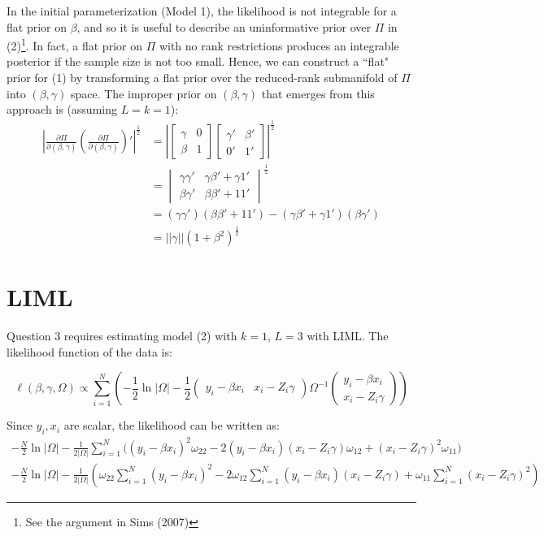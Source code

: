 \documentclass{article}
\begin{document}
In the initial parameterization (Model 1), the likelihood is not integrable for a flat prior on $\beta$, and so it is useful to describe an uninformative prior over $\Pi$ in (2)\footnote{See the argument in Sims (2007)}.  In fact, a flat prior on $\Pi$ with no rank restrictions produces an integrable posterior if the sample size is not too small.  Hence, we can construct a ``flat" prior for (1) by transforming a flat prior over the reduced-rank submanifold of $\Pi$ into $(\beta, \gamma)$ space. The improper prior on $(\beta, \gamma)$ that emerges from this approach is (assuming $L=k=1$):
\begin{align*}
\left| \frac{\partial\Pi}{\partial(\beta, \gamma)} \left( \frac{\partial\Pi}{\partial(\beta, \gamma)} \right)'\right| ^{\frac{1}{2}} &= \left | \begin{bmatrix} \gamma & 0 \\ \beta & 1 \end{bmatrix}  \begin{bmatrix} \gamma' & \beta' \\ 0' & 1' \end{bmatrix}  \right | ^{\frac{1}{2}} \\
&= \begin{vmatrix}  \gamma\gamma' & \gamma\beta' + \gamma 1' \\ \beta\gamma' & \beta\beta' + 11'  \end{vmatrix} ^{\frac{1}{2}} \\
&= (\gamma\gamma')(\beta\beta' + 11') - (\gamma\beta'+\gamma1')(\beta\gamma') \\
&= || \gamma|| (1+\beta^2)^\frac{1}{2} 
\end{align*}

\section*{LIML}
Question 3 requires estimating model (2) with $k=1$, $L=3$ with LIML. The likelihood function of the data is:

\[
\ell (\beta, \gamma, \Omega) \propto \sum_{i=1}^{N} \left( - \frac{1}{2} \ln | \Omega | - \frac{1}{2} \begin{pmatrix} y_i - \beta x_i & x_i - Z_i\gamma\end{pmatrix} \Omega^{-1} \begin{pmatrix} y_i - \beta x_i  \\  x_i - Z_i \gamma\end{pmatrix} \right)
\]

Since $y_i, x_i$ are scalar, the likelihood can be written as:
\begin{gather*}
-\frac{N}{2}\ln | \Omega| - \frac{1}{2 | \Omega| }\sum_{i=1}^N \Big( (y_i - \beta x_i)^2\omega_{22} - 2(y_i - \beta x_i)(x_i - Z_i \gamma)\omega_{12} + (x_i - Z_i \gamma)^2\omega_{11}\Big) \\
-\frac{N}{2}\ln | \Omega| - \frac{1}{2 | \Omega| } \left(\omega_{22} \sum_{i=1}^N (y_i - \beta x_i)^2 - 2 \omega_{12} \sum_{i=1}^N (y_i - \beta x_i)(x_i - Z_i \gamma) + \omega_{11} \sum_{i=1}^N (x_i - Z_i \gamma)^2 \right)
    \end{gather*}
    
\end{document}
